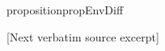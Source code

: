 \documentclass[10pt]{article}
\begin{document}
\begin{ReviewVerbatim}
\begin{restatable}{proposition}{propEnvDiff}
\end{restatable}

[Next verbatim source excerpt]


\end{ReviewVerbatim}
\end{document}
